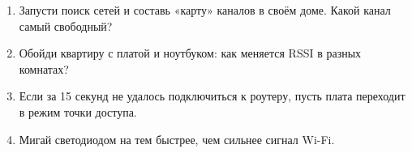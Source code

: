 \begin{tasks}
\begin{enumerate}
  \item Запусти поиск сетей и составь «карту» каналов в своём доме. Какой канал самый свободный?
  \item Обойди квартиру с платой и ноутбуком: как меняется RSSI в разных комнатах?
  \item Если за 15 секунд не удалось подключиться к роутеру, пусть плата переходит в режим точки доступа.
  \item Мигай светодиодом на  тем быстрее, чем сильнее сигнал Wi-Fi.
\end{enumerate}
\end{tasks}
